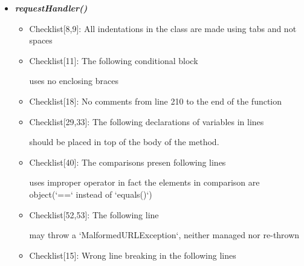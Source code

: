 \documentclass[11pt,titlepage]{article} %
\begin{document}
\begin{itemize}
   
   \item \textbf{\textit{requestHandler()}}
    \begin{itemize}
     \item Checklist[8,9]: All indentations in the class are made using tabs and not spaces
     \item Checklist[11]: The following conditional block
      
      uses no enclosing braces
     \item Checklist[18]: No comments from line 210 to the end of the function
     \item Checklist[29,33]: The following declarations of variables in lines
      
      
      should be placed in top of the body of the method.
     \item Checklist[40]: The comparisons presen following lines
      
      
      
      
      uses improper operator in fact the elements in comparison are object(`==` instead of `equals()`)
     \item Checklist[52,53]: The following line 
      
      may throw a `MalformedURLException`, neither managed nor re-thrown
     \item Checklist[15]: Wrong line breaking in the following lines
      

    \end{itemize}
    

\end{itemize}
\end{document}
